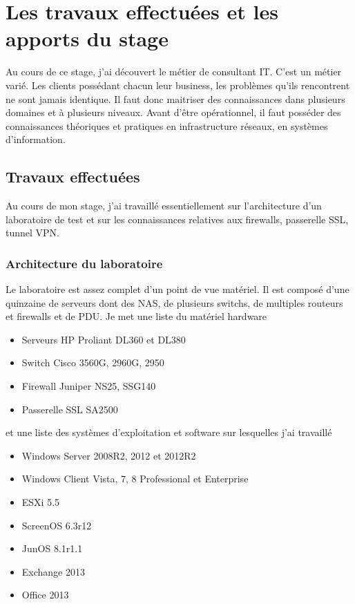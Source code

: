 \chapter{Les travaux effectuées et les apports du stage}
Au cours de ce stage, j'ai découvert le métier de consultant IT. 
C'est un métier varié.
Les clients possédant chacun leur business, les problèmes qu'ils rencontrent ne sont jamais identique.
Il faut donc maitriser des connaissances dans plusieurs domaines et à plusieurs niveaux.
Avant d'être opérationnel, il faut posséder des connaissances théoriques et pratiques en infrastructure réseaux, en systèmes d'information.

\section{Travaux effectuées}
Au cours de mon stage, j'ai travaillé essentiellement sur l'architecture d'un laboratoire de test et sur les connaissances relatives aux firewalls, passerelle SSL, tunnel VPN.

\subsection{Architecture du laboratoire}
Le laboratoire est assez complet d'un point de vue matériel. 
Il est composé d'une quinzaine de serveurs dont des NAS, de plusieurs switchs, de multiples routeurs et firewalls et de PDU.
Je met une liste du matériel hardware
\begin{itemize}
	\item Serveurs HP Proliant DL360 et DL380
	\item Switch Cisco 3560G, 2960G, 2950
	\item Firewall Juniper NS25, SSG140
	\item Passerelle SSL SA2500
\end{itemize}
et une liste des systèmes d'exploitation et software sur lesquelles j'ai travaillé
\begin{itemize}
	\item Windows Server 2008R2, 2012 et 2012R2
	\item Windows Client Vista, 7, 8 Professional et Enterprise
	\item ESXi 5.5
	\item ScreenOS 6.3r12
	\item JunOS 8.1r1.1
	\item Exchange 2013
	\item Office 2013
\end{itemize}

